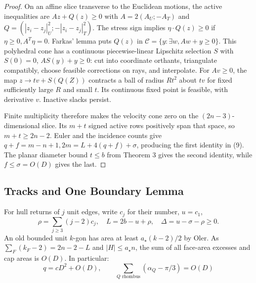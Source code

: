 \documentclass[10pt,reqno]{amsart}
\begin{document}
\begin{proof}
    On an affine slice transverse to the Euclidean motions, the active inequalities are $Az + Q(z) \ge 0$ with $A = 2(A_U ; - A_T)$ and $Q = (|z_i - z_j|^2_U ; -|z_i - z_j|^2_T)$. The stress sign implies $\eta \cdot Q(z) \ge 0$ if $\eta \ge 0, A^T \eta = 0$. Farkas' lemma puts $Q(z)$ in $\mathcal{C} = \{y : \exists w, Aw + y \ge0\}$. This polyhedral cone has a continuous piecewise-linear Lipschitz selection $S$ with $S(0) = 0$, $AS(y) + y \ge 0$: cut into coordinate orthants, triangulate compatibly, choose feasible corrections on rays, and interpolate. For $Av \ge 0$, the map $z \to tv + S(Q(Z))$ contracts a ball of radius $Rt^2$ about $tv$ for fixed sufficiently large $R$ and small $t$. Its continuous fixed point is feasible, with derivative $v$. Inactive slacks persist.

    Finite multiplicity therefore makes the velocity cone zero on the $(2n - 3)$-dimensional slice. Its $m + t$ signed active rows positively span that space, so $m + t \ge 2n - 2$. Euler and the incidence counts give $q + f = m - n + 1, 2m = L + 4(q + f) + \sigma$, producing the first identity in (9). The planar diameter bound $t \le b$ from \cite{6} Theorem 3 gives the second identity, while $f \le \sigma = O(D)$ gives the last.
    
\end{proof}



\subsection{Tracks and One Boundary Lemma}

For hull returns of $j$ unit edges, write $c_j$ for their number, $u = c_1$,
\begin{equation}
    \rho = \sum_{j \ge 3}(j - 2)c_j, \quad L = 2b - u + \rho, \quad \Delta = u - \sigma - \rho \ge 0.
\end{equation}
An old bounded unit $k$-gon has area at least $a_\star (k - 2) / 2$ by Oler. As $\sum_F (k_F - 2) = 2n - 2 - L$ and $|H| \le a_\star n$, the sum of all face-area excesses and cap areas is $O(D)$. In particular:
\begin{equation}
    q = cD^2 + O(D), \qquad \sum_{Q \text{ rhombus}} (\alpha_Q - \pi / 3) = O(D)
\end{equation}
\end{document}
